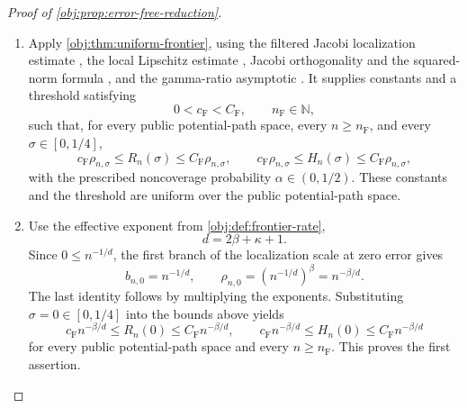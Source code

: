 \documentclass[11pt]{article}
\begin{document}
\begin{proof}[Proof of \cref{obj:prop:error-free-reduction}]
\begin{enumerate}
\item Apply \cref{obj:thm:uniform-frontier}, using the filtered Jacobi localization estimate \citep[Theorem 2.4, equation (2.14)]{PetrushevXu2005}, the local Lipschitz estimate \citep[Theorem 2.2, equation (2.4)]{https://people.math.sc.edu/pencho/Publications/kpx-06-28-06-web.pdf}, Jacobi orthogonality and the squared-norm formula \citep[Table 18.3.1, Jacobi row and caption]{https://dlmf.nist.gov/18.3}, and the gamma-ratio asymptotic \citep[equation (5.11.12)]{https://dlmf.nist.gov/5.11.E12}. It supplies constants and a threshold satisfying
\[
0<c_{\mathrm F}<C_{\mathrm F},
\qquad n_{\mathrm F}\in\mathbb N,
\]
such that, for every public potential-path space, every \(n\ge n_{\mathrm F}\), and every \(\sigma\in[0,1/4]\),
\[
c_{\mathrm F}\rho_{n,\sigma}
\le R_n(\sigma)\le C_{\mathrm F}\rho_{n,\sigma},
\qquad
c_{\mathrm F}\rho_{n,\sigma}
\le H_n(\sigma)\le C_{\mathrm F}\rho_{n,\sigma},
\]
with the prescribed noncoverage probability \(\alpha\in(0,1/2)\). These constants and the threshold are uniform over the public potential-path space.

\item Use the effective exponent from \cref{obj:def:frontier-rate},
\[
d=2\beta+\kappa+1.
\]
Since \(0\le n^{-1/d}\), the first branch of the localization scale at zero error gives
\[
b_{n,0}=n^{-1/d},
\qquad
\rho_{n,0}
=(n^{-1/d})^\beta
=n^{-\beta/d}.
\]
The last identity follows by multiplying the exponents. Substituting \(\sigma=0\in[0,1/4]\) into the bounds above yields
\[
c_{\mathrm F}n^{-\beta/d}
\le R_n(0)\le C_{\mathrm F}n^{-\beta/d},
\qquad
c_{\mathrm F}n^{-\beta/d}
\le H_n(0)\le C_{\mathrm F}n^{-\beta/d}
\]
for every public potential-path space and every \(n\ge n_{\mathrm F}\). This proves the first assertion.


\end{enumerate}
\end{proof}
\end{document}
